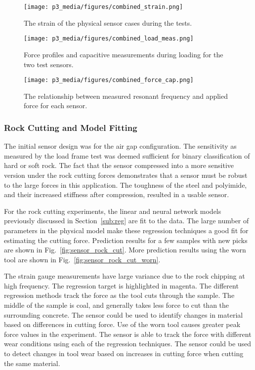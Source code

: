 \begin{figure}[]
\centering
\texttt{[image: p3\_media/figures/combined\_strain.png]}
\caption{The strain of the physical sensor cases during the tests. 
}
\label{fig:sensor_load_frame_strain}
\end{figure}

\begin{figure}[]
\centering
\texttt{[image: p3\_media/figures/combined\_load\_meas.png]}
\caption{Force profiles and capacitive measurements during loading for the two test sensors. 
}
\label{fig:sensor_load_frame}
\end{figure}

\begin{figure}[]
\centering
\texttt{[image: p3\_media/figures/combined\_force\_cap.png]}
\caption{The relationship between measured resonant frequency and applied force for each sensor.
}
\label{fig:sensor_load_frame_sensitivity}
\end{figure}


\subsubsection{Rock Cutting and Model Fitting}

The initial sensor design was for the air gap configuration. The sensitivity as measured by the 
load frame test was deemed sufficient for binary classification of hard or soft rock.
The fact that the sensor compressed into a more sensitive version under the rock cutting forces
demonstrates that a sensor must be robust to the large forces in this application.
The toughness of the steel and polyimide, and their increased stiffness after compression,
resulted in a usable sensor.

For the rock cutting experiments, the linear and neural network models 
 previously discussed in Section~\ref{sub:reg} are fit to the data.
The large number of parameters in the physical model make these regression
techniques a good fit for estimating the cutting force.
Prediction results for a few samples with new picks are shown in Fig.~\ref{fig:sensor_rock_cut}.
More prediction results using the worn tool are shown in Fig.~\ref{fig:sensor_rock_cut_worn}.

The strain gauge measurements have large variance due to the rock chipping at high frequency.
The regression target is highlighted in magenta. The different regression methods track the force
as the tool cuts through the sample. The middle of the sample is coal, and generally takes less force
to cut than the surrounding concrete.
The sensor could be used to identify changes in material based on differences in cutting force.
Use of the worn tool causes greater peak force values in the experiment.
The sensor is able to track the force with different wear conditions
using each of the regression techniques.
The sensor could be used to detect changes in tool wear based on increases in cutting force
when cutting the same material.

